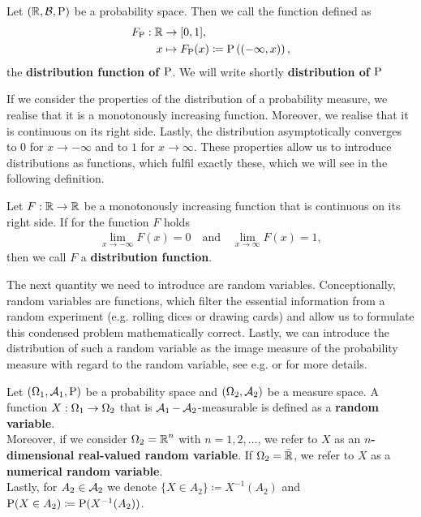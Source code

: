\begin{definition}\label{def:prob_distr_1}
Let $(\operatorname{\mathbb{R}}, \operatorname{\mathcal{B}}, \operatorname{\text{P}})$ be a probability space. Then we call the function defined as
\begin{align*}
F_{\operatorname{\text{P}}}: \operatorname{\mathbb{R}} &\to [0,1 ],\\
x &\mapsto F_{\operatorname{\text{P}}} (x) \coloneqq \operatorname{\text{P}} \left((-\infty, x )\right),
\end{align*}
the \textbf{distribution function of $\operatorname{\text{P}}$}. We will write shortly \textbf{distribution of $\operatorname{\text{P}}$}
\end{definition}

If we consider the properties of the distribution of a probability measure, we realise that it is a monotonously increasing function. Moreover, we realise that it is continuous on its right side. Lastly, the distribution asymptotically converges to $0$ for $x\to-\infty$ and to $1$ for $x\to\infty$. These properties allow us to introduce distributions as functions, which fulfil exactly these, which we will see in the following definition.

\begin{definition}\label{def:prob_distr_2}
Let $F:\operatorname{\mathbb{R}} \to \operatorname{\mathbb{R}}$ be a monotonously increasing function that is continuous on its right side. If for the function $F$ holds
\begin{align*}
\lim_{x\to -\infty} F(x) = 0 \quad \text{and} \quad \lim_{x\to \infty} F(x) = 1,
\end{align*}
then we call $F$ a \textbf{distribution function}.
\end{definition}

The next quantity we need to introduce are random variables. Conceptionally, random variables are functions, which filter the essential information from a random experiment (e.g. rolling dices or drawing cards) and allow us to formulate this condensed problem mathematically correct. Lastly, we can introduce the distribution of such a random variable as the image measure of the probability measure with regard to the random variable, see e.g. \cite[Definition~1.42]{meintrup2006stochastik} or \cite[Definition~1.102]{klenke2013probability} for more details.

\begin{definition}\label{def:rv}
Let $(\Omega_1, \operatorname{\mathcal{A}}_1, \operatorname{\text{P}})$ be a probability space and $(\Omega_2, \operatorname{\mathcal{A}}_2)$ be a measure space. A function $X: \Omega_1 \to \Omega_2$ that is $\operatorname{\mathcal{A}}_1-\operatorname{\mathcal{A}}_2$-measurable is defined as a \textbf{random variable}.\\
Moreover, if we consider $\Omega_2= \operatorname{\mathbb{R}}^n$ with $n=1,2,\ldots$, we refer to $X$ as an \textbf{$n$-dimensional real-valued random variable}. If $\Omega_2 = \bar{\operatorname{\mathbb{R}}}$, we refer to $X$ as a \textbf{numerical random variable}.\\
Lastly, for $A_2\in\operatorname{\mathcal{A}}_2$ we denote $\{X\in A_2\}\coloneqq X^{-1}(A_2)$ and $\operatorname{\text{P}}(X\in A_2) \coloneqq \operatorname{\text{P}}(X^{-1}(A_2))$.
\end{definition}

